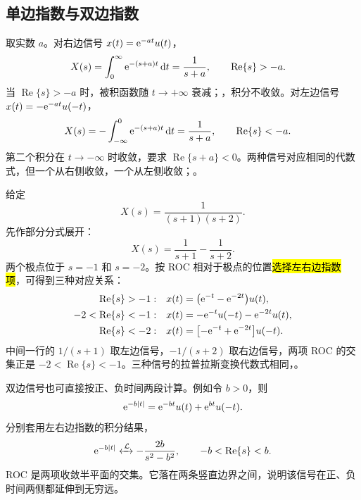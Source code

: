 \subsection{单边指数与双边指数}
\label{subsec:laplace-exponential-examples}

取实数 $a$。对右边信号 $x(t)=\mathrm{e}^{-at}u(t)$，
\begin{align}
  X(s)
  &=\int_0^\infty \mathrm{e}^{-(s+a)t}\mathop{}\!\mathrm{d} t
   =\frac{1}{s+a}, \qquad \operatorname{Re}\{s\}>-a.
  \label{eq:laplace-right-exponential}
\end{align}
当 $\operatorname{Re}\{s\}>-a$ 时，被积函数随 $t\to+\infty$ 衰减；，积分不收敛。对左边信号 $x(t)=-\mathrm{e}^{-at}u(-t)$，
\begin{align}
  X(s)
  &=-\int_{-\infty}^{0}\mathrm{e}^{-(s+a)t}\mathop{}\!\mathrm{d} t
   =\frac{1}{s+a}, \qquad \operatorname{Re}\{s\}<-a.
  \label{eq:laplace-left-exponential}
\end{align}
第二个积分在 $t\to-\infty$ 时收敛，要求 $\operatorname{Re}\{s+a\}<0$。两种信号对应相同的代数式，但一个从右侧收敛，一个从左侧收敛；。

\begin{example}[同一有理式对应的三种信号]
  给定
  \[
    X(s)=\frac{1}{(s+1)(s+2)}.
  \]
  先作部分分式展开：
  \[
    X(s)=\frac{1}{s+1}-\frac{1}{s+2}.
  \]
  两个极点位于 $s=-1$ 和 $s=-2$。按 ROC 相对于极点的位置\hl{选择左右边指数项}，可得到三种对应关系：
  \begin{align*}
    \operatorname{Re}\{s\}>-1:\quad
      &x(t)=\bigl(\mathrm{e}^{-t}-\mathrm{e}^{-2t}\bigr)u(t),\\
    -2<\operatorname{Re}\{s\}<-1:\quad
      &x(t)=-\mathrm{e}^{-t}u(-t)-\mathrm{e}^{-2t}u(t),\\
    \operatorname{Re}\{s\}<-2:\quad
      &x(t)=\bigl[-\mathrm{e}^{-t}+\mathrm{e}^{-2t}\bigr]u(-t).
  \end{align*}
  中间一行的 $1/(s+1)$ 取左边信号，$-1/(s+2)$ 取右边信号，两项 ROC 的交集正是 $-2<\operatorname{Re}\{s\}<-1$。三种信号的拉普拉斯变换代数式相同，。
\end{example}

双边信号也可直接按正、负时间两段计算。例如令 $b>0$，则
\[
  \mathrm{e}^{-b|t|}
  =\mathrm{e}^{-bt}u(t)+\mathrm{e}^{bt}u(-t).
\]
分别套用左右边指数的积分结果，
\begin{equation}
  \mathrm{e}^{-b|t|}
  \mathrel{\xleftrightarrow{\,\mathcal{L}\,}} -\frac{2b}{s^2-b^2},
  \qquad -b<\operatorname{Re}\{s\}<b.
  \label{eq:laplace-two-sided-exponential}
\end{equation}
ROC 是两项收敛半平面的交集。它落在两条竖直边界之间，说明该信号在正、负时间两侧都延伸到无穷远。

